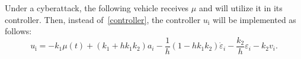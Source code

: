 {%

Under a cyberattack, the following vehicle receives $\mu$ and will utilize it in its controller. Then, instead of~\eqref{controller}, the controller $u_{\text{i}}$ will be implemented as follows:
\begin{equation}\label{control_uc}
        u_{\text{i}}=-k_{1} \mu(t) + (k_{1}+h k_{1}k_{2}){a}_{i} 
        -\frac{1}{h}(1-h k_{1}k_{2})\dot{\varepsilon}_{i} -\frac{k_{2}}{h}\varepsilon_{i}-k_{2} {v}_{i}.
\end{equation}
%

}
